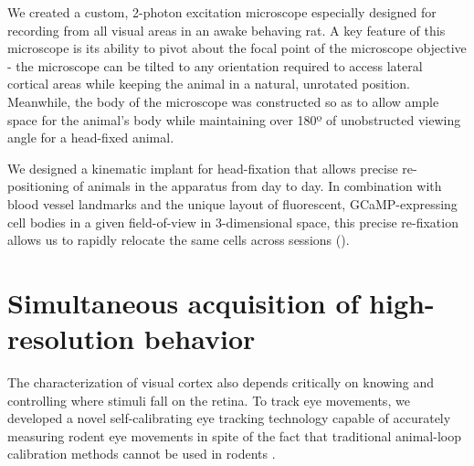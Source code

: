 We created a custom, 2-photon excitation microscope especially designed for recording from all visual areas in an awake behaving rat. A key feature of this microscope is its ability to pivot about the focal point of the microscope objective - the microscope can be tilted to any orientation required to access lateral cortical areas while keeping the animal in a natural, unrotated position. Meanwhile, the body of the microscope was constructed so as to allow ample space for the animal's body while maintaining over 180º of unobstructed viewing angle for a head-fixed animal.

We designed a kinematic implant for head-fixation that allows precise re-positioning of animals in the apparatus from day to day. In combination with blood vessel landmarks and the unique layout of fluorescent, GCaMP-expressing cell bodies in a given field-of-view in 3-dimensional space, this precise re-fixation allows us to rapidly relocate the same cells across sessions ().  

\section{Simultaneous acquisition of high-resolution behavior}

The characterization of visual cortex also depends critically on knowing and controlling where stimuli fall on the retina.  To track eye movements, we developed a novel self-calibrating eye tracking technology capable of accurately measuring rodent eye movements in spite of the fact that traditional animal-loop calibration methods cannot be used in rodents \cite{Zoccolan:2010aa}.

